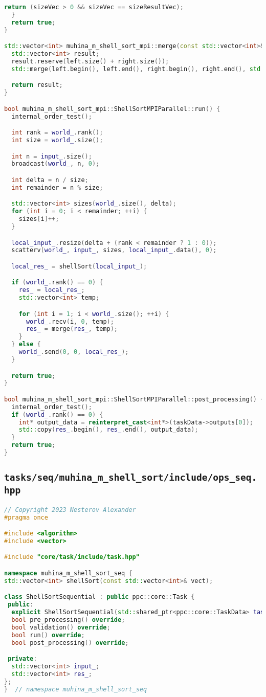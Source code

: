 \documentclass[12pt]{article}
\begin{document}
\begin{lstlisting}[language=C++]
    return (sizeVec > 0 && sizeVec == sizeResultVec);
  }
  return true;
}

std::vector<int> muhina_m_shell_sort_mpi::merge(const std::vector<int>& left, const std::vector<int>& right) {
  std::vector<int> result;
  result.reserve(left.size() + right.size());
  std::merge(left.begin(), left.end(), right.begin(), right.end(), std::back_inserter(result));

  return result;
}

bool muhina_m_shell_sort_mpi::ShellSortMPIParallel::run() {
  internal_order_test();

  int rank = world_.rank();
  int size = world_.size();

  int n = input_.size();
  broadcast(world_, n, 0);

  int delta = n / size;
  int remainder = n % size;

  std::vector<int> sizes(world_.size(), delta);
  for (int i = 0; i < remainder; ++i) {
    sizes[i]++;
  }

  local_input_.resize(delta + (rank < remainder ? 1 : 0));
  scatterv(world_, input_, sizes, local_input_.data(), 0);

  local_res_ = shellSort(local_input_);

  if (world_.rank() == 0) {
    res_ = local_res_;
    std::vector<int> temp;

    for (int i = 1; i < world_.size(); ++i) {
      world_.recv(i, 0, temp);
      res_ = merge(res_, temp);
    }
  } else {
    world_.send(0, 0, local_res_);
  }

  return true;
}

bool muhina_m_shell_sort_mpi::ShellSortMPIParallel::post_processing() {
  internal_order_test();
  if (world_.rank() == 0) {
    int* output_data = reinterpret_cast<int*>(taskData->outputs[0]);
    std::copy(res_.begin(), res_.end(), output_data);
  }
  return true;
}
\end{lstlisting}
\subsection*{\texttt{tasks/seq/muhina\_m\_shell\_sort/include/ops\_seq.hpp}}

\begin{lstlisting}[language=C++]
// Copyright 2023 Nesterov Alexander
#pragma once

#include <algorithm>
#include <vector>

#include "core/task/include/task.hpp"

namespace muhina_m_shell_sort_seq {
std::vector<int> shellSort(const std::vector<int>& vect);

class ShellSortSequential : public ppc::core::Task {
 public:
  explicit ShellSortSequential(std::shared_ptr<ppc::core::TaskData> taskData_) : Task(std::move(taskData_)) {}
  bool pre_processing() override;
  bool validation() override;
  bool run() override;
  bool post_processing() override;

 private:
  std::vector<int> input_;
  std::vector<int> res_;
};
}  // namespace muhina_m_shell_sort_seq
\end{lstlisting}
\end{document}
